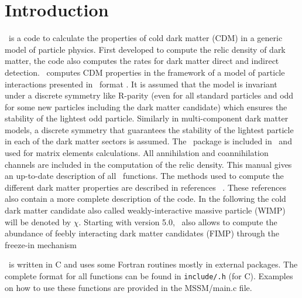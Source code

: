 \documentclass[12pt,a4paper]{article}
\begin{document}
\section{Introduction}
\micro\ is a code to calculate the properties of cold dark matter (CDM)  in a generic model of particle physics.  
 First developed to compute the relic density of dark matter, 
 the code also computes the rates for dark matter direct and  indirect detection. 
 \micro\ computes CDM properties in the framework of a model of particle
 interactions presented in \calchep\ format \cite{Pukhov:2004ca}. 
 It is assumed that the model is invariant under  a discrete symmetry like R-parity (even for 
all standard particles and odd for some new particles including the dark matter candidate) which ensures 
the stability of the lightest  odd particle.  Similarly in multi-component dark matter models,  a discrete symmetry that guarantees the stability of the lightest particle in each of the dark matter sectors  is assumed.
 The \calchep\  package is included in \micro\ and used for matrix elements calculations.
All annihilation and coannihilation channels are included in the computation of the relic density. 
This manual gives an up-to-date description of all \micro\ functions.  
The methods used to compute the different dark matter properties are described 
in references 
~\cite{Belanger:2001fz,Belanger:2004yn,Belanger:2006is,Belanger:2008sj,Belanger:2010gh,Belanger:2013oya,Belanger:2014vza,Barducci:2016pcb,Belanger:2018ccd}.
These references also contain  a more complete description of the code. In the following
the cold dark matter candidate also called weakly-interactive massive particle (WIMP)
will be denoted by $\chi$. 
Starting with version 5.0, \micro\ also allows to  compute
the abundance of feebly interacting dark matter candidates (FIMP) through the freeze-in
mechanism ~\cite{Belanger:2018ccd}


\micro\ is written in  C  and uses some Fortran routines mostly in external packages. 
The complete format  for all functions can be found in
\verb|include/.h| (for C). Examples on how to use these functions are provided   
in the MSSM/main.c file. 
 


 
\end{document}

